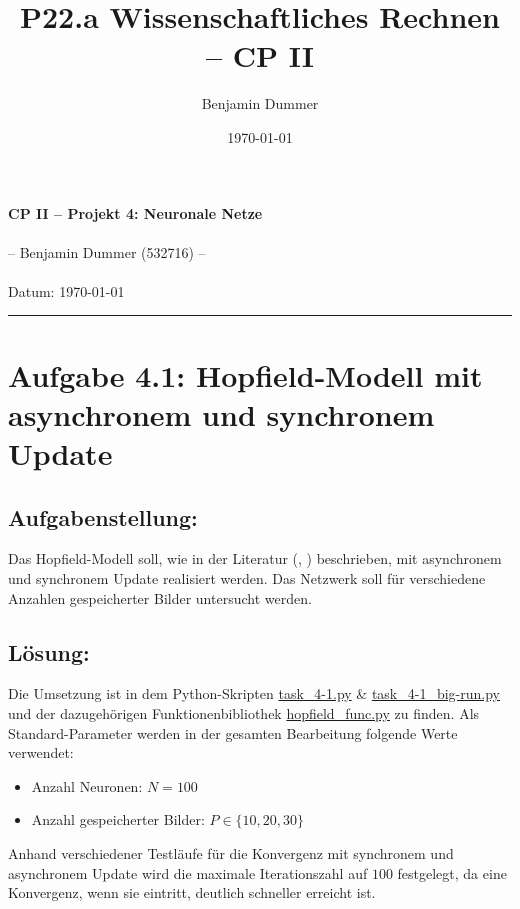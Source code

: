 \documentclass[12pt,a4paper]{article}
\title{P22.a Wissenschaftliches Rechnen -- CP II}
\author{Benjamin Dummer}
\date{\today}
\begin{document}


\lstset{numbers=left}

\begin{center}
\large{\textbf{CP II -- Projekt 4: Neuronale Netze} \\
~\\
\small{-- Benjamin Dummer (532716) --}\\
~\\
Datum: \today}
\end{center}
\hrule 

\section*{Aufgabe 4.1: Hopfield-Modell mit asynchronem und synchronem Update}
\subsection*{Aufgabenstellung:}
Das Hopfield-Modell soll, wie in der Literatur (\cite{skript}, \cite{buch}) beschrieben, mit asynchronem und synchronem Update realisiert werden. Das Netzwerk soll für verschiedene Anzahlen gespeicherter Bilder untersucht werden.
\subsection*{Lösung:}
Die Umsetzung ist in dem Python-Skripten \url{task_4-1.py} \& \url{task_4-1_big-run.py} und der dazugehörigen Funktionenbibliothek \url{hopfield_func.py} zu finden. Als Standard-Parameter werden in der gesamten Bearbeitung folgende Werte verwendet:
\begin{itemize}
    \item Anzahl Neuronen: $N = 100$
    \item Anzahl gespeicherter Bilder: $P \in \{10, 20, 30\}$
\end{itemize}
Anhand verschiedener Testläufe für die Konvergenz mit synchronem und asynchronem Update wird die maximale Iterationszahl auf $100$ festgelegt, da eine Konvergenz, wenn sie eintritt, deutlich schneller erreicht ist.
\end{document}

